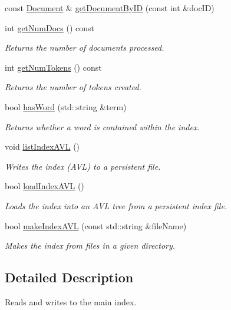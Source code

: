 \begin{DoxyCompactItemize}
const \hyperlink{class_document}{Document} \& \hyperlink{class_index_handler_a99ae2a9f65e44cb1b83b3cb865cbc81c}{get\+Document\+By\+I\+D} (const int \&doc\+I\+D)
\item 
int \hyperlink{class_index_handler_a342414794783dc47d71b7a3034356d46}{get\+Num\+Docs} () const 
\begin{DoxyCompactList}\small\item\em Returns the number of documents processed. \end{DoxyCompactList}\item 
int \hyperlink{class_index_handler_a3bad0c158a41fa574d3507af6cc7267e}{get\+Num\+Tokens} () const 
\begin{DoxyCompactList}\small\item\em Returns the number of tokens created. \end{DoxyCompactList}\item 
bool \hyperlink{class_index_handler_a78bae3a45ea4d4e09e576b482bf58f78}{has\+Word} (std\+::string \&term)
\begin{DoxyCompactList}\small\item\em Returns whether a word is contained within the index. \end{DoxyCompactList}\item 
void \hyperlink{class_index_handler_ad05b01f580d6d13d879d805750dfb4d0}{list\+Index\+A\+V\+L} ()
\begin{DoxyCompactList}\small\item\em Writes the index (A\+V\+L) to a persistent file. \end{DoxyCompactList}\item 
bool \hyperlink{class_index_handler_a5b56a244de1d63699ab5ba1ca8606544}{load\+Index\+A\+V\+L} ()
\begin{DoxyCompactList}\small\item\em Loads the index into an A\+V\+L tree from a persistent index file. \end{DoxyCompactList}\item 
bool \hyperlink{class_index_handler_a6dc7f45d95d8c3b9fe11056296c9de3d}{make\+Index\+A\+V\+L} (const std\+::string \&file\+Name)
\begin{DoxyCompactList}\small\item\em Makes the index from files in a given directory. \end{DoxyCompactList}\end{DoxyCompactItemize}


\subsection{Detailed Description}
Reads and writes to the main index. 

